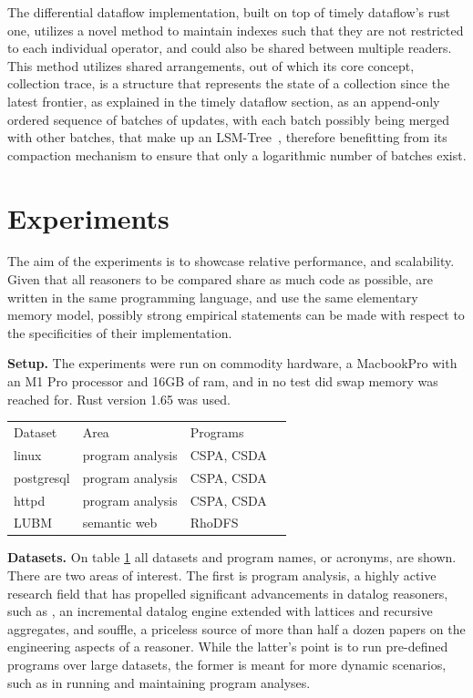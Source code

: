 \documentclass[sigconf,screen,review,natbib]{acmart}
\theoremstyle{definition}
\begin{document}
The differential dataflow implementation, built on top of timely dataflow's rust one, utilizes a novel method to maintain indexes such that they are not restricted
to each individual operator, and could also be shared between multiple readers. This method utilizes shared arrangements, out of which its core concept, collection
trace, is a structure that represents the state of a collection since the latest frontier, as explained in the timely dataflow section, as an append-only ordered sequence
of batches of updates, with each batch possibly being merged with other batches, that make up an LSM-Tree~\cite{lsm}, therefore benefitting from its compaction mechanism
to ensure that only a logarithmic number of batches exist.

\section{Experiments}

The aim of the experiments is to showcase relative performance, and scalability. Given that all reasoners to be compared share as much code as possible, are written in the same
programming language, and use the same elementary memory model, possibly strong empirical statements can be made with respect to the specificities of their implementation.

\textbf{Setup.} The experiments were run on commodity hardware, a MacbookPro with an M1 Pro processor and 16GB of ram, and in no test did swap memory was reached for.
Rust version 1.65 was used.

\begin{table}[]
	\begin{tabular}{llll}
		Dataset    & Area             & Programs   \\
		linux      & program analysis & CSPA, CSDA \\
		postgresql & program analysis & CSPA, CSDA \\
		httpd      & program analysis & CSPA, CSDA \\
		LUBM       & semantic web     & RhoDFS
	\end{tabular}
	\label{table:datasets}
\end{table}

\textbf{Datasets.} On table \ref{table:datasets} all datasets and program names, or acronyms, are shown. There are two areas of interest. The first is program analysis, a highly active research
field that has propelled significant advancements in datalog reasoners, such as \cite{incA}, an incremental datalog engine extended with lattices and recursive aggregates, and
souffle\cite{souffle}, a priceless source of more than half a dozen papers on the engineering aspects of a reasoner. While the latter's point is to run pre-defined programs over
large datasets, the former is meant for more dynamic scenarios, such as in running and maintaining program analyses.
\end{document}
